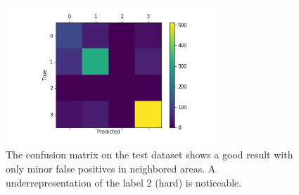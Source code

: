 \documentclass[runningheads]{llncs}
\begin{document}
\begin{figure}
\centering 
\includegraphics[width=0.70\textwidth]{confusionmatrix.png}
\caption{The confusion matrix on the test dataset shows a good result with only minor false positives in neighbored areas. A underrepresentation of the label 2 (hard) is noticeable.}
\label{fig3}	
\end{figure}





\end{document}
